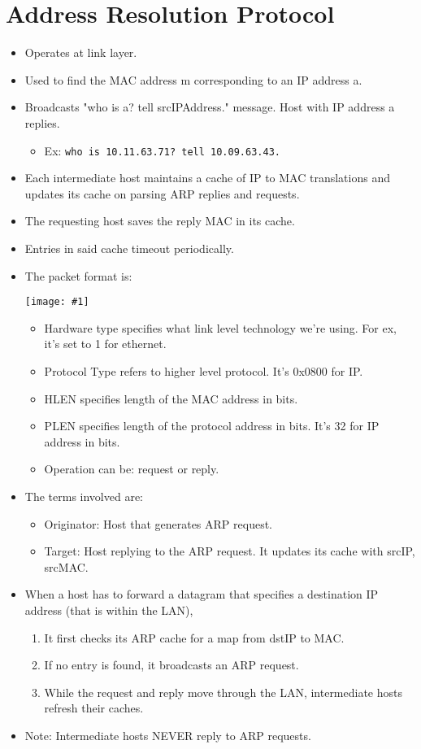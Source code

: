 \documentclass{report}
\makeatletter
\def\maxwidth#1{\ifdim\Gin@nat@width>#1 #1\else\Gin@nat@width\fi}
\newcommand{\mygraphic}[1]{
\begin{center}
    \texttt{[image: \#1]}
\end{center}
}
\makeatother
\begin{document}
\section{Address Resolution Protocol}
\label{sec:arp}
\begin{itemize}
\item Operates at link layer.
\item Used to find the MAC address m corresponding to an IP address a.
\item Broadcasts "who is a? tell srcIPAddress." message. Host with IP address a replies.
\begin{itemize}
\item Ex: \texttt{who is 10.11.63.71? tell 10.09.63.43.}
\end{itemize}
\item Each intermediate host maintains a cache of IP to MAC translations and updates its cache on parsing ARP replies and requests.
\item The requesting host saves the reply MAC in its cache.
\item Entries in said cache timeout periodically.
\item The packet format is:
\mygraphic{rsrc/arppacket.png}
\begin{itemize}
\item Hardware type specifies what link level technology we're using. For ex, it's set to 1 for ethernet.
\item Protocol Type refers to higher level protocol. It's 0x0800 for IP.
\item HLEN specifies length of the MAC address in bits.
\item PLEN specifies length of the protocol address in bits. It's 32 for IP address in bits.
\item Operation can be: request or reply.
\end{itemize}
\item The terms involved are:
\begin{itemize}
\item Originator: Host that generates ARP request.
\item Target: Host replying to the ARP request. It updates its cache with srcIP, srcMAC.
\end{itemize}
\item When a host has to forward a datagram that specifies a destination IP address (that is within the LAN),
\begin{enumerate}
    \item It first checks its ARP cache for a map from dstIP to MAC.
    \item If no entry is found, it broadcasts an ARP request.
    \item While the request and reply move through the LAN, intermediate hosts refresh their caches.
\end{enumerate}
\item Note: Intermediate hosts NEVER reply to ARP requests.
\end{itemize}
\end{document}
